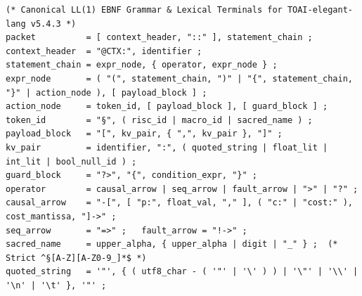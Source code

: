 \documentclass[9pt,a4paper]{extarticle}
\begin{document}
\begin{lstlisting}
(* Canonical LL(1) EBNF Grammar & Lexical Terminals for TOAI-elegant-lang v5.4.3 *)
packet          = [ context_header, "::" ], statement_chain ;
context_header  = "@CTX:", identifier ;
statement_chain = expr_node, { operator, expr_node } ;
expr_node       = ( "(", statement_chain, ")" | "{", statement_chain, "}" | action_node ), [ payload_block ] ;
action_node     = token_id, [ payload_block ], [ guard_block ] ;
token_id        = "§", ( risc_id | macro_id | sacred_name ) ;
payload_block   = "[", kv_pair, { ",", kv_pair }, "]" ;
kv_pair         = identifier, ":", ( quoted_string | float_lit | int_lit | bool_null_id ) ;
guard_block     = "?>", "{", condition_expr, "}" ;
operator        = causal_arrow | seq_arrow | fault_arrow | ">" | "?" ;
causal_arrow    = "-[", [ "p:", float_val, "," ], ( "c:" | "cost:" ), cost_mantissa, "]->" ;
seq_arrow       = "=>" ;   fault_arrow = "!->" ;
sacred_name     = upper_alpha, { upper_alpha | digit | "_" } ;  (* Strict ^§[A-Z][A-Z0-9_]*$ *)
quoted_string   = '"', { ( utf8_char - ( '"' | '\' ) ) | '\"' | '\\' | '\n' | '\t' }, '"' ;
\end{lstlisting}
\end{document}

